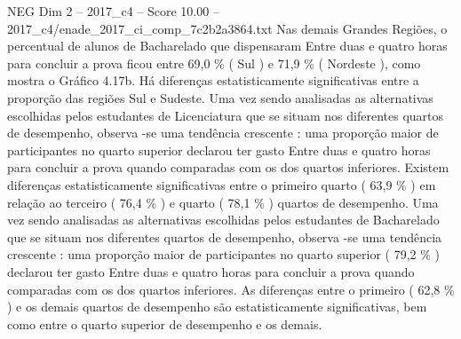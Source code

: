 \begin{textsample}{NEG Dim 2 – 2017\_c4 – Score 10.00 – 2017\_c4/enade\_2017\_ci\_comp\_7c2b2a3864.txt}
Nas demais Grandes Regiões, o percentual de alunos de Bacharelado que dispensaram Entre duas e quatro horas para concluir a prova ficou entre 69,0 \% ( Sul ) e 71,9 \% ( Nordeste ), como mostra o Gráfico 4.17b.
Há diferenças estatisticamente significativas entre a proporção das regiões Sul e Sudeste.
Uma vez sendo analisadas as alternativas escolhidas pelos estudantes de Licenciatura que se situam nos diferentes quartos de desempenho, observa -se uma tendência crescente : uma proporção maior de participantes no quarto superior declarou ter gasto Entre duas e quatro horas para concluir a prova quando comparadas com os dos quartos inferiores.
Existem diferenças estatisticamente significativas entre o primeiro quarto ( 63,9 \% ) em relação ao terceiro ( 76,4 \% ) e quarto ( 78,1 \% ) quartos de desempenho.
Uma vez sendo analisadas as alternativas escolhidas pelos estudantes de Bacharelado que se situam nos diferentes quartos de desempenho, observa -se uma tendência crescente : uma proporção maior de participantes no quarto superior ( 79,2 \% ) declarou ter gasto Entre duas e quatro horas para concluir a prova quando comparadas com os dos quartos inferiores.
As diferenças entre o primeiro ( 62,8 \% ) e os demais quartos de desempenho são estatisticamente significativas, bem como entre o quarto superior de desempenho e os demais.

\end{textsample}
